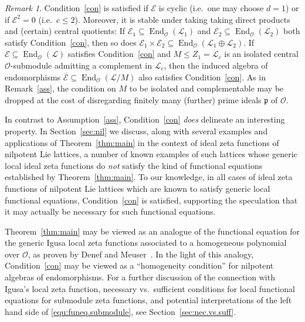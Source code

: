 \documentclass[11pt]{amsart}
\numberwithin{equation}{section}
\numberwithin{figure}{section}
\theoremstyle{plain}
\theoremstyle{definition}
\theoremstyle{remark}
\newtheorem{remark}[theorem]{Remark}
\begin{document}
\begin{remark}\label{rem:con.sat}
  Condition~\ref{con} is satisfied if ${\mathcal{E}}$ is cyclic (i.e.\ one may
  choose $d=1$) or if ${\mathcal{E}}^2=0$ (i.e.\ $c \leq 2$). Moreover, it is
  stable under taking taking direct products and (certain) central
  quotients: If ${\mathcal{E}}_1\subseteq \operatorname{End}_{\ensuremath{\mathcal{O}}}({\ensuremath{\mathcal{L}}}_1)$ and
${\mathcal{E}}_2\subseteq \operatorname{End}_{\ensuremath{\mathcal{O}}}({\ensuremath{\mathcal{L}}}_2)$ both satisfy
Condition~\ref{con}, then so does ${\mathcal{E}}_1\times {\mathcal{E}}_2
\subseteq \operatorname{End}_{\ensuremath{\mathcal{O}}}({\ensuremath{\mathcal{L}}}_1\oplus {\ensuremath{\mathcal{L}}}_2)$.  If
${\mathcal{E}}\subseteq \operatorname{End}_{\ensuremath{\mathcal{O}}}({\ensuremath{\mathcal{L}}})$ satisfies Condition~\ref{con} and $M
\leq Z_1 = {\ensuremath{\mathcal{L}}}_c$ is an isolated central ${\ensuremath{\mathcal{O}}}$-submodule admitting a
complement in ${\ensuremath{\mathcal{L}}}_c$, then the induced algebra of endomorphisms
$\overline{\mathcal{E}}\subseteq \operatorname{End}_{\ensuremath{\mathcal{O}}}({\ensuremath{\mathcal{L}}}/M)$ also satisfies
Condition~\ref{con}. As in Remark~\ref{ass}, the condition on $M$ to
be isolated and complementable may be dropped at the cost of
disregarding finitely many (further) prime ideals ${\mathfrak{p}}$ of ${\ensuremath{\mathcal{O}}}$.
\end{remark}

In contrast to Assumption~\ref{ass}, Condition~\ref{con} \emph{does}
delineate an interesting property. In Section~\ref{sec:nil} we
discuss, along with several examples and applications of
Theorem~\ref{thm:main} in the context of ideal zeta functions of
nilpotent Lie lattices, a number of known examples of such lattices
whose generic local ideal zeta functions do \emph{not} satisfy the
kind of functional equations established by Theorem~\ref{thm:main}. To
our knowledge, in all cases of ideal zeta functions of nilpotent Lie
lattices which are known to satisfy generic local functional
equations, Condition~\ref{con} is satisfied, supporting the
speculation that it may actually be necessary for such functional
equations.

Theorem~\ref{thm:main} may be viewed as an analogue of the functional
equation for the generic Igusa local zeta functions associated to a
{homogeneous} polynomial over ${\ensuremath{\mathcal{O}}}$, as proven by Denef and
Meuser~\cite{DenefMeuser/91}. In the light of this analogy,
Condition~\ref{con} may be viewed as a ``homogeneity condition'' for
nilpotent algebras of endomorphisms. For a further discussion of the
connection with Igusa's local zeta function, necessary vs.\ sufficient
conditions for local functional equations for submodule zeta
functions, and potential interpretations of the left hand side of
\eqref{equ:funeq.submodule}, see Section~\ref{sec:nec.vs.suff}.
\end{document}
